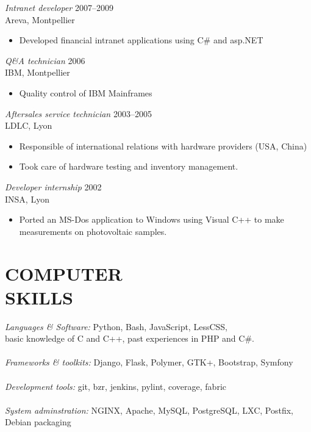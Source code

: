 \documentclass[margin]{res}
\begin{document}
\begin{resume}
{\sl Intranet developer\/} \hfill 2007--2009 \\
Areva, Montpellier
\begin{itemize}  \itemsep -2pt
    \item  Developed financial intranet applications using C\# and asp.NET
\end{itemize}

{\sl Q\&A technician\/} \hfill 2006 \\
IBM, Montpellier
\begin{itemize}  \itemsep -2pt
    \item  Quality control of IBM Mainframes
\end{itemize}

{\sl Aftersales service technician\/} \hfill     2003--2005 \\
LDLC, Lyon
\begin{itemize}  \itemsep -2pt
    \item Responsible of international relations with hardware providers (USA, China)
    \item Took care of hardware testing and inventory management.
\end{itemize}

{\sl Developer internship\/} \hfill 2002 \\
INSA, Lyon
\begin{itemize} \itemsep -2pt
    \item  Ported an MS-Dos application to Windows using Visual C++ to make
    measurements on photovoltaic samples.
\end{itemize}


\section{COMPUTER \\ SKILLS}
    {\sl Languages \& Software:\/} Python, Bash, JavaScript, LessCSS, \\
         basic knowledge of C and C++,  past experiences in PHP and C\#.\\ \\
    {\sl Frameworks \& toolkits:\/} Django, Flask, Polymer, GTK+, Bootstrap, Symfony\\ \\
    {\sl Development tools:\/} git, bzr, jenkins, pylint, coverage, fabric\\ \\
    {\sl System adminstration:\/} NGINX, Apache, MySQL, PostgreSQL, LXC, Postfix, Debian packaging



\end{resume}
\end{document}
